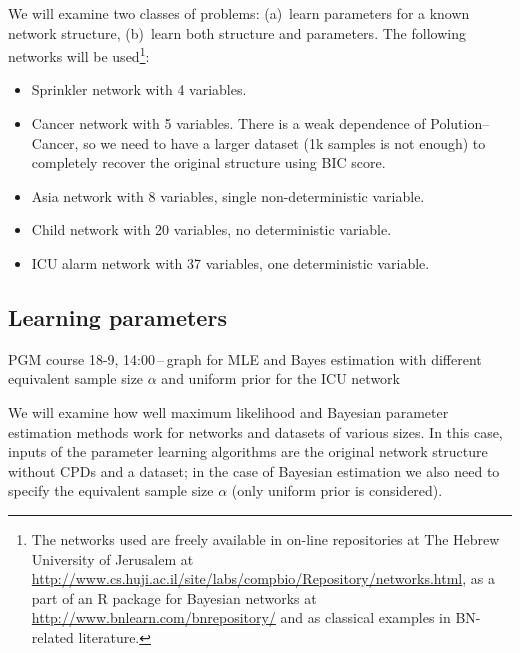\documentclass[english,cover]{fitthesis} %
\newcommand{\todo}[1]{{\color{red}#1}}
\begin{document}
We will examine two classes of problems: (a)~learn parameters for a known network structure, (b)~learn both structure and parameters. The following networks will be used\footnote{The networks used are freely available in on-line repositories at The Hebrew University of Jerusalem at \url{http://www.cs.huji.ac.il/site/labs/compbio/Repository/networks.html}, as a part of an R package for Bayesian networks at \url{http://www.bnlearn.com/bnrepository/} and as classical examples in BN-related literature.}:
\begin{itemize}
	\item Sprinkler network with 4 variables.
	\item Cancer network with 5 variables. There is a weak dependence of Polution--Cancer, so we need to have a larger dataset (1k samples is not enough) to completely recover the original structure using BIC score.
	\item Asia network with 8 variables, single non-deterministic variable.
	\item Child network with 20 variables, no deterministic variable.
	\item ICU alarm network with 37 variables, one deterministic variable.
\end{itemize}


\subsection{Learning parameters}

\todo{PGM course 18-9, 14:00\,--\,graph for MLE and Bayes estimation with different equivalent sample size $\alpha$ and uniform prior for the ICU network}

We will examine how well maximum likelihood and Bayesian parameter estimation methods work for networks and datasets of various sizes. In this case, inputs of the parameter learning algorithms are the original network structure without CPDs and a dataset; in the case of Bayesian estimation we also need to specify the equivalent sample size $\alpha$ (only uniform prior is considered).
\end{document}
